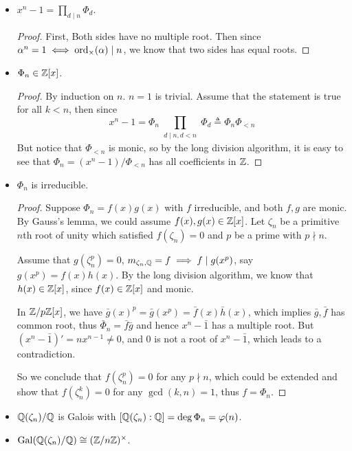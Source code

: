 \begin{prop} \hfill
  \begin{itemize}
    \item $x^n - 1 = \prod_{d \mid n} \Phi_d$.
      \begin{proof}
        First, Both sides have no multiple root. Then since $\alpha^n = 1 \iff \operatorname{ord}_{\times}(\alpha) \mid n$,
        we know that two sides has equal roots.
      \end{proof}
    \item $\Phi_n \in \mathbb{Z}[x]$.
      \begin{proof}
        By induction on $n$. $n = 1$ is trivial.
        Assume that the statement is true for all $k < n$, then since
        \[ x^n - 1 = \Phi_n \prod_{\substack{d \mid n, d < n}} \Phi_d \triangleq \Phi_n \Phi_{< n} \]
        But notice that $\Phi_{<n}$ is monic, so by the long division algorithm, it is easy to
        see that $\Phi_n = (x^n - 1) / \Phi_{<n}$ has all coefficients in $\mathbb{Z}$.
      \end{proof}
    \item $\Phi_n$ is irreducible.
      \begin{proof}
        Suppose $\Phi_n = f(x) g(x)$ with $f$ irreducible, and both $f, g$ are monic.
        By Gauss's lemma, we could assume $f(x), g(x) \in \mathbb{Z}[x]$.
        Let $\zeta_n$ be a primitive $n$th root of unity which satisfied $f(\zeta_n) = 0$
        and $p$ be a prime with $p \nmid n$.

        Assume that $g(\zeta_n^p) = 0$, $m_{\zeta_n, \mathbb{Q}} = f \implies f \mid g(x^p)$,
        say $g(x^p) = f(x) h(x)$.
        By the long division algorithm, we know that $h(x) \in \mathbb{Z}[x]$, since $f(x) \in \mathbb{Z}[x]$
        and monic.

        In $\mathbb{Z} / p\mathbb{Z}[x]$, we have $\bar{g}(x)^p = \bar{g}(x^p) = \bar{f}(x) \bar{h}(x)$,
        which implies $\bar{g}, \bar{f}$ has common root, thus $\bar\Phi_n = \bar{f}\bar{g}$ and
        hence $x^n - \bar{1}$ has a multiple root.
        But $(x^n - \bar{1})' = nx^{n-1} \neq 0$, and $0$ is not a root of $x^n - \bar{1}$,
        which leads to a contradiction.

        So we conclude that $f(\zeta_n^p) = 0$ for any $p \nmid n$, which could be extended
        and show that $f(\zeta_n^k) = 0$ for any $\gcd(k, n) = 1$, thus $f = \Phi_n$.
      \end{proof}
    \item $\mathbb{Q}(\zeta_n) / \mathbb{Q}$ is Galois with $[\mathbb{Q}(\zeta_n): \mathbb{Q}] = \deg \Phi_n = \varphi(n)$.
    \item $\operatorname{Gal}(\mathbb{Q}(\zeta_n) / \mathbb{Q}) \cong ({\mathbb{Z}}/{n\mathbb{Z}})^\times$.


\end{itemize}
\end{prop}
